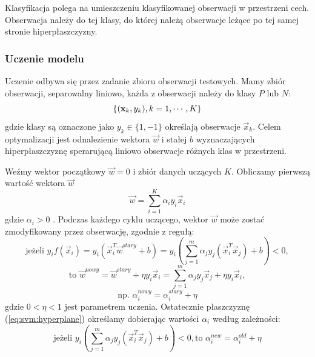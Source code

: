 \documentclass[a4paper,12pt,twoside,openany]{report}
\newcommand{\Eq}[1]{(\ref{#1})}
\begin{document}
Klasyfikacja polega na umieszczeniu klasyfikowanej obserwacji w przestrzeni cech.
Obserwacja należy do tej klasy, do której należą obserwacje leżące po tej samej stronie hiperpłaszczyzny.
\subsubsection{Uczenie modelu}
Uczenie odbywa się przez zadanie zbioru obserwacji testowych. 
Mamy zbiór obserwacji, separowalny liniowo, każda z obserwacji należy do klasy $P$ lub $N$:
\begin{displaymath}
	\{ ({\bf x}_k, y_k), k=1,\cdots,K \} 
\end{displaymath}
gdzie klasy są oznaczone jako $y_k \in \{1,-1\}$ określają obserwacje $\vec{x}_k$.
Celem optymalizacji jest odnalezienie wektora $\vec{w}$ i stałej $b$ wyznaczających hiperpłaszczyznę
sperarującą liniowo obserwacje różnych klas w przestrzeni. 

Weźmy wektor początkowy $\vec{w} = 0$ i zbiór danych uczących $K$.
Obliczamy pierwszą wartość wektora $\vec{w}$
\begin{equation}\label{eq:svm:hyperplane}
	{\vec{w}}=\sum_{i=1}^K \alpha_i y_i {\vec{x}}_i
\end{equation}
gdzie $\alpha_i>0$ \cite{Mittal2016}.
Podczas każdego cyklu uczącego, wektor $\vec{w}$ może zostać zmodyfikowany przez obserwację, 
zgodnie z regułą:
\begin{equation}
	\mbox{jeżeli } y_i f({\vec{x}}_i)=y_i ({\vec{x}}_i^T{\vec{w}}^{stary}+b)
	=y_i\left(\sum_{j=1}^m \alpha_j y_j({\vec{x}}_i^T{\vec{x}}_j)+b\right)<0,
\end{equation}
\begin{equation}
	\mbox{to } {\vec{w}}^{nowy}={\vec{w}}^{stary}+\eta y_i {\vec{x}}_i
	=\sum_{j=1}^{m} \alpha_j y_j\vec{x}_j +\eta y_i {\vec{x}}_i,
\end{equation}
\begin{equation}
	\mbox{np. }
	\alpha_i^{nowy}=\alpha_i^{stary}+\eta
\end{equation}
gdzie $0 < \eta < 1$ jest parametrem uczenia.
Ostatecznie płaszczyznę \Eq{eq:svm:hyperplane} określamy dobierając wartości $\alpha_i$ według zależności: 
\begin{equation}
	\mbox{jeżeli } y_i\left(\sum_{j=1}^m \alpha_j y_j({\vec{x}}_i^T\vec{x}_j)+b\right)<0,
	\mbox{to } \alpha_i^{new}=\alpha_i^{old}+\eta 
\end{equation}
\end{document}
